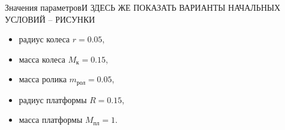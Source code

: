 \begin{frame}{Значения параметров}{И ЗДЕСЬ ЖЕ ПОКАЗАТЬ ВАРИАНТЫ НАЧАЛЬНЫХ УСЛОВИЙ -- РИСУНКИ}
    \begin{itemize}
        \item радиус колеса $r = 0.05$,
        \item масса колеса $ M_{\text{к}} = 0.15$, 
        \item масса ролика $m_{\text{рол}} = 0.05$, 
        \item радиус платформы $R = 0.15$, 
        \item масса платформы $M_{\text{пл}} = 1$.
    \end{itemize}
\end{frame}